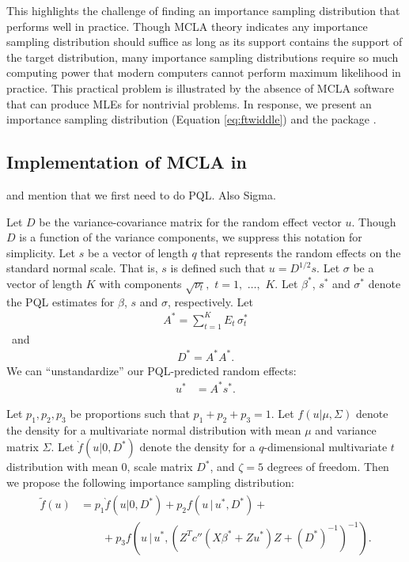 \documentclass[article]{jss}
\begin{document}
This highlights the challenge of  finding an importance sampling distribution that performs well in practice. Though MCLA theory indicates any importance sampling distribution should suffice as long as its support contains the support of the target distribution, many importance sampling distributions require so much computing power that modern computers cannot perform maximum likelihood in practice.
  This practical problem is  illustrated by the absence of MCLA software that can produce MLEs for nontrivial problems. In response, we present an importance sampling distribution (Equation  \ref{eq:ftwiddle}) and the  package .\\



\subsection[Implementation of MCLA in glmm]{Implementation of MCLA in  }

 and mention that we first need to do PQL. Also Sigma.

Let $D$ be the variance-covariance matrix for the random effect vector $u$. Though $D$ is a function of the variance components, we suppress this notation for simplicity.
Let $s$ be a vector of length $q$ that represents the random effects on the standard normal scale. That is, $s$ is defined such that $u= D^{1/2}s$. Let $\sigma$ be a vector of length $K$ with components $\sqrt{\nu_t},$ $t=1,$ $\ldots,$ $K$.  Let $\beta^*$, $s^*$ and $\sigma^*$ denote the PQL estimates for $\beta$, $s$ and $\sigma$, respectively.  Let
\begin{align}
A^*=\sum_{t=1}^K E_t \, \sigma^*_t \nonumber
\end{align}\
and
\begin{align}
 D^* =A^*A^*. \nonumber
\end{align}
 We can ``unstandardize'' our PQL-predicted random effects:
\begin{align}
u^*&=A^*s^*. \nonumber
\end{align}


Let $p_1,p_2,p_3$ be  proportions  such that  \hbox{$p_1+p_2+p_3=1$}.  Let $f(u|\mu,\Sigma)$ denote the density for a multivariate normal distribution with mean $\mu$ and variance matrix $\Sigma$.   
Let $\grave{f}(u|0,D^*)$ denote the density for  a $q$-dimensional multivariate  $t$ distribution with mean $0$, scale matrix $D^*$, and $\zeta=5$ degrees of freedom. Then we propose the following importance sampling distribution:
\begin{align}\label{eq:ftwiddle}
\begin{split}
 \tilde{f}(u) &= p_1  \grave{f}(u|0,D^*)+p_2  f(u \, | \, u^*, D^*)+\\
&\qquad + p_3  f(u \, | \, u^*, (Z^T  c''(X \beta^*+Zu^*) Z +(D^*)^{-1}   )^{-1}). 
\end{split}
\end{align}
\end{document}
